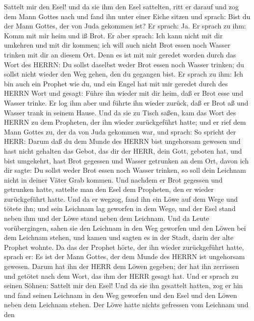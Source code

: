 Sattelt mir den Esel! und da sie ihm den Esel sattelten, ritt er darauf
 und zog dem Mann Gottes nach und fand ihn unter einer
Eiche sitzen und sprach: Bist du der Mann Gottes, der von Juda gekommen
ist? Er sprach: Ja.  Er sprach zu ihm: Komm mit mir heim
und iß Brot.  Er aber sprach: Ich kann nicht mit dir
umkehren und mit dir kommen; ich will auch nicht Brot essen noch Wasser
trinken mit dir an diesem Ort.  Denn es ist mit mir geredet
worden durch das Wort des HERRN: Du sollst daselbst weder Brot essen
noch Wasser trinken; du sollst nicht wieder den Weg gehen, den du
gegangen bist.  Er sprach zu ihm: Ich bin auch ein Prophet
wie du, und ein Engel hat mit mir geredet durch des HERRN Wort und
gesagt: Führe ihn wieder mit dir heim, daß er Brot esse und Wasser
trinke. Er log ihm aber  und führte ihn wieder zurück, daß
er Brot aß und Wasser trank in seinem Hause.  Und da sie zu
Tisch saßen, kam das Wort des HERRN zu dem Propheten, der ihn wieder
zurückgeführt hatte;  und er rief dem Mann Gottes zu, der
da von Juda gekommen war, und sprach: So spricht der HERR: Darum daß du
dem Munde des HERRN bist ungehorsam gewesen und hast nicht gehalten das
Gebot, das dir der HERR, dein Gott, geboten hat,  und bist
umgekehrt, hast Brot gegessen und Wasser getrunken an dem Ort, davon ich
dir sagte: Du sollst weder Brot essen noch Wasser trinken, so soll dein
Leichnam nicht in deiner Väter Grab kommen.  Und nachdem er
Brot gegessen und getrunken hatte, sattelte man den Esel dem Propheten,
den er wieder zurückgeführt hatte.  Und da er wegzog, fand
ihn ein Löwe auf dem Wege und tötete ihn; und sein Leichnam lag geworfen
in dem Wege, und der Esel stand neben ihm und der Löwe stand neben dem
Leichnam.  Und da Leute vorübergingen, sahen sie den
Leichnam in den Weg geworfen und den Löwen bei dem Leichnam stehen, und
kamen und sagten es in der Stadt, darin der alte Prophet wohnte.
 Da das der Prophet hörte, der ihn wieder zurückgeführt
hatte, sprach er: Es ist der Mann Gottes, der dem Munde des HERRN ist
ungehorsam gewesen. Darum hat ihn der HERR dem Löwen gegeben; der hat
ihn zerrissen und getötet nach dem Wort, das ihm der HERR gesagt hat.
 Und er sprach zu seinen Söhnen: Sattelt mir den Esel! Und
da sie ihn gesattelt hatten,  zog er hin und fand seinen
Leichnam in den Weg geworfen und den Esel und den Löwen neben dem
Leichnam stehen. Der Löwe hatte nichts gefressen vom Leichnam und den
